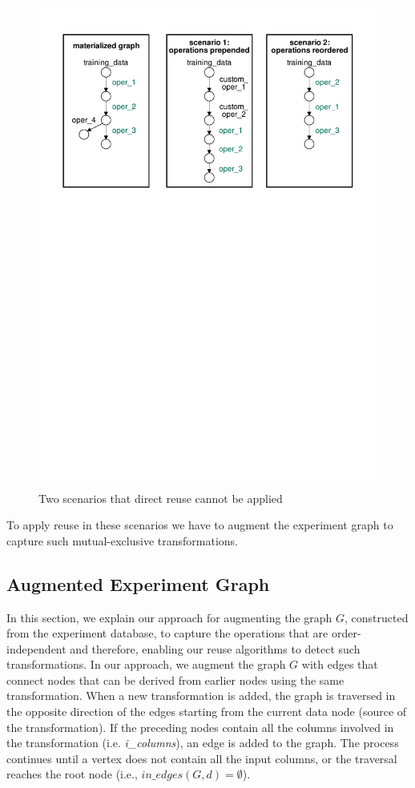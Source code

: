 \begin{figure}
\centering
\includegraphics[width=\columnwidth]{../images/unaligned-operations}
\caption{Two scenarios that direct reuse cannot be applied}
\label{fig-unaligned-operations}
\end{figure}

To apply reuse in these scenarios we have to augment the experiment graph to capture such mutual-exclusive transformations.

\subsection{Augmented Experiment Graph}
In this section, we explain our approach for augmenting the graph $G$, constructed from the experiment database, to capture the operations that are order-independent and therefore, enabling our reuse algorithms to detect such transformations.
In our approach, we augment the graph $G$ with edges that connect nodes that can be derived from earlier nodes using the same transformation.
When a new transformation is added, the graph is traversed in the opposite direction of the edges starting from the current data node (source of the transformation).
If the preceding nodes contain all the columns involved in the transformation (i.e. \textit{i\_columns}), an edge is added to the graph.
The process continues until a vertex does not contain all the input columns, or the traversal reaches the root node (i.e., $in\_edges(G,d) = \emptyset$).

